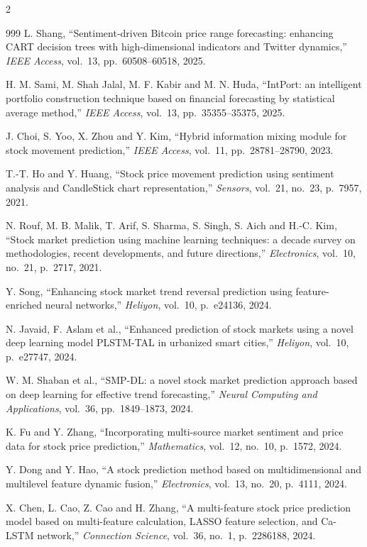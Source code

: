 \begin{footnotesize}
\begin{multicols}{2}
\begin{thebibliography}{999}
 L. Shang, ``Sentiment-driven Bitcoin price range forecasting: enhancing CART
decision trees with high-dimensional indicators and Twitter dynamics,'' \emph{IEEE Access},
vol.~13, pp.~60508--60518, 2025.

 H. M. Sami, M. Shah Jalal, M. F. Kabir and M. N. Huda, ``IntPort: an
intelligent portfolio construction technique based on financial forecasting by statistical average
method,'' \emph{IEEE Access}, vol.~13, pp.~35355--35375, 2025.

 J. Choi, S. Yoo, X. Zhou and Y. Kim, ``Hybrid information mixing module for
stock movement prediction,'' \emph{IEEE Access}, vol.~11, pp.~28781--28790, 2023.

 T.-T. Ho and Y. Huang, ``Stock price movement prediction using sentiment
analysis and CandleStick chart representation,'' \emph{Sensors}, vol.~21, no.~23, p.~7957, 2021.

 N. Rouf, M. B. Malik, T. Arif, S. Sharma, S. Singh, S. Aich and H.-C. Kim,
``Stock market prediction using machine learning techniques: a decade survey on methodologies,
recent developments, and future directions,'' \emph{Electronics}, vol.~10, no.~21, p.~2717, 2021.

 Y. Song, ``Enhancing stock market trend reversal prediction using
feature-enriched neural networks,'' \emph{Heliyon}, vol.~10, p.~e24136, 2024.

 N. Javaid, F. Aslam et al., ``Enhanced prediction of stock markets using a
novel deep learning model PLSTM-TAL in urbanized smart cities,'' \emph{Heliyon}, vol.~10,
p.~e27747, 2024.

 W. M. Shaban et al., ``SMP-DL: a novel stock market prediction approach based
on deep learning for effective trend forecasting,'' \emph{Neural Computing and Applications},
vol.~36, pp.~1849--1873, 2024.

 K. Fu and Y. Zhang, ``Incorporating multi-source market sentiment and price data
for stock price prediction,'' \emph{Mathematics}, vol.~12, no.~10, p.~1572, 2024.

 Y. Dong and Y. Hao, ``A stock prediction method based on multidimensional and
multilevel feature dynamic fusion,'' \emph{Electronics}, vol.~13, no.~20, p.~4111, 2024.

 X. Chen, L. Cao, Z. Cao and H. Zhang, ``A multi-feature stock price
prediction model based on multi-feature calculation, LASSO feature selection, and Ca-LSTM
network,'' \emph{Connection Science}, vol.~36, no.~1, p.~2286188, 2024.


\end{thebibliography}
\end{multicols}
\end{footnotesize}
